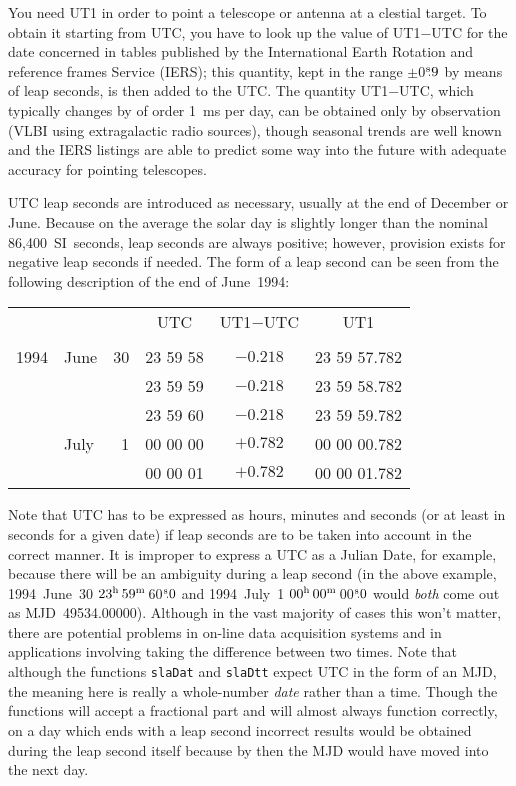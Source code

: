 \documentclass[11pt,fleqn,twoside]{article}
\renewcommand{\_}{{\tt\char'137}}     %
\newcommand{\tseci}[1]   {$#1$\mbox{$^{\rm s}$}}
\newcommand{\tsec}[2]    {\tseci{#1}$\hspace{-0.3em}.#2$}
\newcommand{\hms}[4]    {$#1^{\rm h}\,#2^{\rm m}\,$\tsec{#3}{#4}}
\begin{document}
You need UT1 in order to point a telescope or antenna at a
clestial target.  To obtain it
starting from UTC, you
have to look up the value of UT1$-$UTC for the date concerned
in tables published by the International Earth Rotation and
reference frames
Service (IERS);  this quantity, kept in the range
$\pm$\tsec{0}{9} by means of leap
seconds, is then added to the UTC.  The quantity UT1$-$UTC,
which typically changes by of order 1~ms per day,
can be obtained only by observation (VLBI using
extragalactic radio sources), though seasonal trends
are well known and the IERS listings are able to predict some way into
the future with adequate accuracy for pointing telescopes.

UTC leap seconds are introduced as necessary,
usually at the end of December or June.
Because on the average the solar day is slightly longer
than the nominal 86,400~SI~seconds, leap seconds are always positive;
however, provision exists for negative leap seconds if needed.
The form of a leap second can be seen from the
following description of the end of June~1994:

\hspace{3em}
\begin{tabular}{clrccc} \\
     &      &    &   UTC    & UT1$-$UTC  &    UT1       \\ \\
1994 & June & 30 & 23 59 58 & $-0.218$ & 23 59 57.782 \\
     &      &    & 23 59 59 & $-0.218$ & 23 59 58.782 \\
     &      &    & 23 59 60 & $-0.218$ & 23 59 59.782 \\
     & July &  1 & 00 00 00 & $+0.782$ & 00 00 00.782 \\
     &      &    & 00 00 01 & $+0.782$ & 00 00 01.782 \\
\end{tabular}
\goodbreak

Note that UTC has to be expressed as hours, minutes and
seconds (or at least in seconds for a given date) if leap seconds
are to be taken into account in the
correct manner.
It is improper to express a UTC as a
Julian Date, for example, because there will be an ambiguity
during a leap second (in the above example,
1994~June~30 \hms{23}{59}{60}{0} and
1994~July~1 \hms{00}{00}{00}{0} would {\it both}\/ come out as
MJD~49534.00000).  Although in the vast majority of
cases this won't matter, there are potential problems in
on-line data acquisition systems and in applications involving
taking the difference between two times.  Note that although the functions
{\tt slaDat}
and
{\tt slaDtt}
expect UTC in the form of an MJD, the meaning here is really a
whole-number {\it date}\/ rather than a time.
Though the functions will accept
a fractional part and will almost always function correctly, on a day
which ends with a leap
second incorrect results would be obtained during the leap second
itself because by then the MJD would have moved into the next day.
\end{document}

